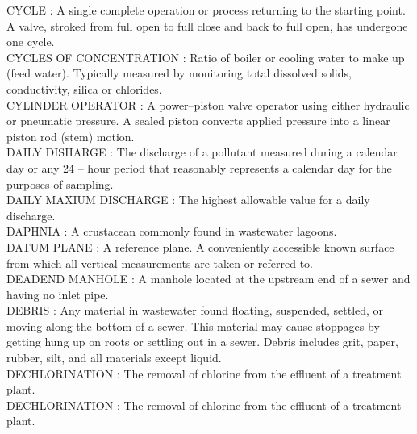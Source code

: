 \vspace{0.15cm}
CYCLE :   A single complete operation or process returning to the starting point. A valve, stroked from full open to full close and back to full open, has undergone one cycle.\\
\vspace{0.15cm}
CYCLES OF CONCENTRATION :  Ratio of boiler or cooling water to make up (feed water). Typically measured by monitoring total dissolved solids, conductivity, silica or chlorides.\\
\vspace{0.15cm}
CYLINDER OPERATOR :   A power–piston valve operator using either hydraulic or pneumatic pressure. A sealed piston converts applied pressure into a linear piston rod (stem) motion.\\
\vspace{0.15cm}
DAILY DISHARGE :  The discharge of a pollutant measured during a calendar day or any 24 – hour period that reasonably represents a calendar day for the purposes of sampling. \\
\vspace{0.15cm}
DAILY MAXIUM DISCHARGE :  The highest allowable value for a daily discharge. \\
\vspace{0.15cm}
DAPHNIA :  A crustacean commonly found in wastewater lagoons.\\
\vspace{0.15cm}
DATUM PLANE :   A reference plane.   A conveniently accessible known surface from which all vertical measurements are taken or referred to.\\
\vspace{0.15cm}
DEADEND MANHOLE :  A manhole located at the upstream end of a sewer and having no inlet pipe. \\
\vspace{0.15cm}
DEBRIS :  Any material in wastewater found floating, suspended, settled, or moving along the bottom of a sewer. This material may cause stoppages by getting hung up on roots or settling out in a sewer. Debris includes grit, paper, rubber, silt, and all materials except liquid. \\
\vspace{0.15cm}
DECHLORINATION :  The removal of chlorine from the effluent of a treatment plant.\\
\vspace{0.15cm}
DECHLORINATION :  The removal of chlorine from the effluent of a treatment plant.\\
